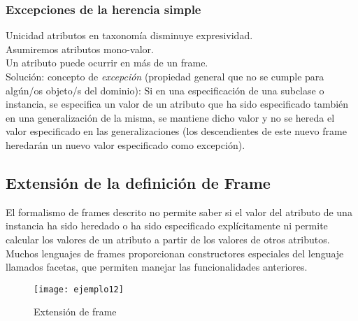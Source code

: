 \documentclass[12pt]{article}
\begin{document}
\subsubsection{Excepciones de la herencia simple}
Unicidad atributos en taxonomía disminuye expresividad.\\
Asumiremos atributos mono-valor.\\
Un atributo puede ocurrir en más de un frame.\\
Solución: concepto de \textit{excepción} (propiedad general que no se cumple para algún/os objeto/s del dominio): Si en una especificación de una subclase o instancia, se especifica un valor de un atributo que ha sido especificado también en una generalización de la misma, se mantiene dicho valor y no se hereda el valor especificado en las generalizaciones (los descendientes de este nuevo frame heredarán un nuevo valor especificado como excepción).

\subsection{Extensión de la definición de Frame}
El formalismo de frames descrito no permite saber si el valor del atributo de una instancia ha sido heredado o ha sido especificado explícitamente ni permite calcular los valores de un atributo a partir de los valores de otros atributos.\\
Muchos lenguajes de frames proporcionan constructores especiales del lenguaje llamados facetas, que permiten manejar las funcionalidades anteriores.

\begin{wrapfigure}{r}{0.35\textwidth}
\texttt{[image: ejemplo12]}
\caption{Extensión de frame}
\label{fig:ejemplo12}
\end{wrapfigure}
\end{document}
